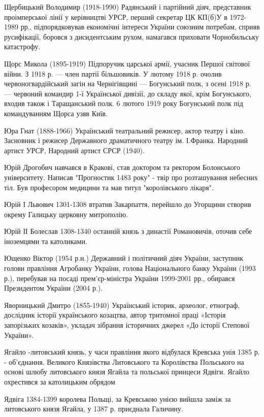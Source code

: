 Щербицький Володимир (1918-1990) Радянський і партійний діяч, представник проімперської лінії у керівництві УРСР, перший секретар ЦК КП(б)У в 1972-1989 рр., підпорядковував економічні інтереси України союзним потребам, сприяв русифікації, боровся з дисидентським рухом, намагався приховати Чорнобильську катастрофу.

Щорс Микола (1895-1919) Підпоручик царської армії, учасник Першої світової війни. З 1918 р. --- член партії більшовиків. У лютому 1918 р. очолив червоногвардійський загін на Чернігівщині --- Богунський полк, з осені 1918 р. --- червоний командир 1-ї Української дивізії,  до складу якої, крім Богунського, входив також і Таращанський полк.  6 лютого 1919 року Богунський полк під командуванням Щорса узяв Київ.  

Юра Гнат (1888-1966) Український театральний режисер, актор театру і кіно. Засновник і режисер Державного драматичного театру ім. І.Франка. Народний артист УРСР, Народний артист СРСР (1940).

Юрій Дрогобич навчався в Кракові, став доктором та ректором Болонського університету. Написав "Прогностик 1483 року" - твір про розташування небесних тіл. Був професором медицини та мав титул "королівського лікаря".

Юрій І Львович 1301-1308 втратив Закарпаття, перейшло до Угорщини створив окрему Галицьку церковну митрополію.

Юрій ІІ Болеслав 1308-1340 останній князь з династії Романовичів, оточив себе іноземцями та католиками.

Ющенко Віктор (1954 р.н.) Державний і політичний діяч України, заступник голови правління Агробанку України, голова Національного банку України (1993 р.), перебував на посаді прем’єр-міністра України 1999-2001 рр., обирався Президентом України (2004 р.).

Яворницький Дмитро (1855-1940) Український історик, археолог, етнограф, дослідник історії українського козацтва, автор тритомної праці «Історія запорізьких козаків», укладач зібрання історичних джерел «До історії Степової України».

Ягайло -литовський князь, у часи правління якого відбулася Кревська унія 1385 р. - об’єднання. Великого Князівства Литовського та Королівства Польського на основі шлюбу литовського князя Ягайла та польської принцеси Ядвіги. Ягайло охрестився за католицьким обрядом

Ядвіга 1384-1399 королева Польщі, за Кревською унією вийшла заміж за литовського князя Ягайла, у 1387 р. приєднала Галичину.

